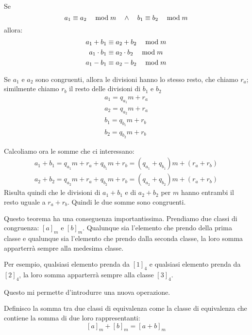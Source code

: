 \begin{teorema}
    Se
    \begin{equation*}
         a_1 \equiv a_2 \quad\bmod m  \quad\land\quad  b_1 \equiv b_2 \quad\bmod m 
    \end{equation*}
    allora:
    \begin{gather*}
         a_1 + b_1 \equiv a_2 + b_2 \quad\bmod m  \\
         a_1 \cdot b_1 \equiv a_2 \cdot b_2 \quad\bmod m  \\
         a_1 - b_1 \equiv a_2 - b_2 \quad\bmod m 
    \end{gather*}


    Se $a_1$ e $a_2$ sono congruenti, allora le divisioni hanno lo stesso resto, che chiamo $r_a$;
    similmente chiamo $r_b$ il resto delle divisioni di $b_1$ e $b_2$
    \begin{gather*}
        a_1 = q_{a_1} m + r_a \\
        a_2 = q_{a_2} m + r_a \\
        b_1 = q_{b_1} m + r_b \\
        b_2 = q_{b_2} m + r_b
    \end{gather*}

    Calcoliamo ora le somme che ci interessano:
    \begin{gather*}
        a_1 + b_1 = q_{a_1} m + r_a + q_{b_1} m + r_b = (q_{a_1} + q_{b_1}) m + (r_a + r_b) \\
        a_2 + b_2 = q_{a_2} m + r_a + q_{b_2} m + r_b = (q_{a_2} + q_{b_2}) m + (r_a + r_b)
    \end{gather*}
    Risulta quindi che le divisioni di $a_1 + b_1$ e di $a_2 + b_2$ per $m$ hanno entrambi il resto uguale a $r_a + r_b$.
    Quindi le due somme sono congruenti.
\end{teorema}

Questo teorema ha una conseguenza importantissima.
Prendiamo due classi di congruenza: $[a]_m$ e $[b]_m$.
Qualunque sia l'elemento che prendo della prima classe e qualunque sia l'elemento che prendo dalla seconda classe, la loro somma apparterrà sempre alla medesima classe.

Per esempio, qualsiasi elemento prenda da $[1]_4$ e qualsiasi elemento prenda da $[2]_4$, la loro somma apparterrà sempre alla classe $[3]_4$.

Questo mi permette d'introdurre una nuova operazione.

\begin{definizione}
    Definisco la somma tra due classi di equivalenza come la classe di equivalenza che contiene la somma di due loro rappresentanti:
    \begin{equation}
        \label{eq:somma} [a]_m + [b]_m = [a + b]_m
    \end{equation}
\end{definizione}


